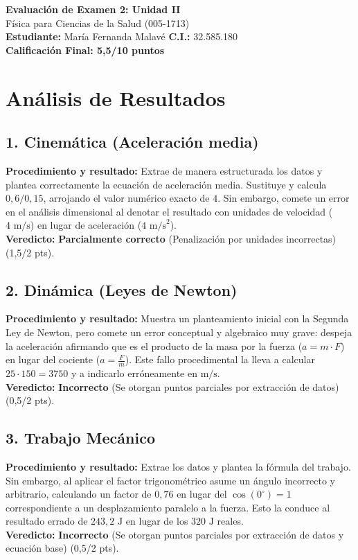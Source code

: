 \documentclass[12pt,letterpaper]{article}
\begin{document}
\begin{center}
    \Large \textbf{Evaluación de Examen 2: Unidad II} \\
    \large Física para Ciencias de la Salud (005-1713) \\
    \vspace{0.5cm}
    \textbf{Estudiante:} María Fernanda Malavé \quad \textbf{C.I.:} 32.585.180
    \vspace{0.3cm} \\
    \large \textbf{Calificación Final: 5,5/10 puntos}
\end{center}

\vspace{0.5cm}

\section*{Análisis de Resultados}

\subsection*{1. Cinemática (Aceleración media)}
\textbf{Procedimiento y resultado:} Extrae de manera estructurada los datos y plantea correctamente la ecuación de aceleración media. Sustituye y calcula $0,6 / 0,15$, arrojando el valor numérico exacto de $4$. Sin embargo, comete un error en el análisis dimensional al denotar el resultado con unidades de velocidad ($4 \text{ m/s}$) en lugar de aceleración ($4 \text{ m/s}^2$). \\
\textbf{Veredicto:} \textbf{Parcialmente correcto} (Penalización por unidades incorrectas) (1,5/2 pts).

\subsection*{2. Dinámica (Leyes de Newton)}
\textbf{Procedimiento y resultado:} Muestra un planteamiento inicial con la Segunda Ley de Newton, pero comete un error conceptual y algebraico muy grave: despeja la aceleración afirmando que es el producto de la masa por la fuerza ($a = m \cdot F$) en lugar del cociente ($a = \frac{F}{m}$). Este fallo procedimental la lleva a calcular $25 \cdot 150 = 3750$ y a indicarlo erróneamente en $\text{m/s}$. \\
\textbf{Veredicto:} \textbf{Incorrecto} (Se otorgan puntos parciales por extracción de datos) (0,5/2 pts).

\subsection*{3. Trabajo Mecánico}
\textbf{Procedimiento y resultado:} Extrae los datos y plantea la fórmula del trabajo. Sin embargo, al aplicar el factor trigonométrico asume un ángulo incorrecto y arbitrario, calculando un factor de $0,76$ en lugar del $\cos(0^\circ) = 1$ correspondiente a un desplazamiento paralelo a la fuerza. Esto la conduce al resultado errado de $243,2 \text{ J}$ en lugar de los $320 \text{ J}$ reales. \\
\textbf{Veredicto:} \textbf{Incorrecto} (Se otorgan puntos parciales por extracción de datos y ecuación base) (0,5/2 pts).
\end{document}
